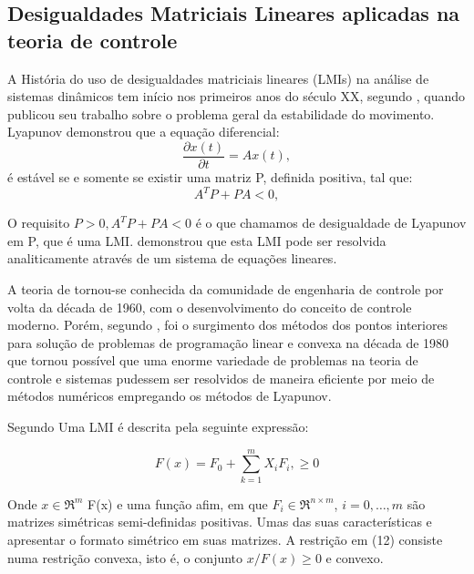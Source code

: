 \subsection{Desigualdades Matriciais Lineares aplicadas na teoria de controle}
A História do uso de desigualdades matriciais lineares (LMIs) na análise de sistemas dinâmicos tem início nos primeiros anos do século XX, segundo \cite{Boyd1994LinearTheory}, quando \cite{Lyapunov1992TheMotion} publicou seu trabalho sobre o problema geral da estabilidade do movimento. Lyapunov demonstrou que a equação diferencial:
\begin{equation} \label{eq:lyapunovdif}
  \frac{\partial x(t)}{\partial t} = Ax(t), 
\end{equation}
é estável se e somente se existir uma matriz P, definida positiva, tal que:
\begin{equation} \label{eq:lyapunovlmi}
  A^{T}P + PA < 0,
\end{equation}
    
O requisito $P>0, A^{T} P + PA < 0$ é o que chamamos de desigualdade de Lyapunov em P, que é uma LMI. \cite{Lyapunov1992TheMotion} demonstrou que esta LMI pode ser resolvida analiticamente através de um sistema de equações lineares.
    
A teoria de \cite{Lyapunov1992TheMotion} tornou-se conhecida da comunidade de engenharia de controle por volta da década de 1960, com o desenvolvimento do conceito de controle moderno. Porém, segundo \cite{Rodrigues2018ParameterizedSystems}, foi o surgimento dos métodos dos pontos interiores para solução de problemas de programação linear e convexa na década de 1980 que tornou possível que uma enorme variedade de problemas na teoria de controle e sistemas pudessem ser resolvidos de maneira eficiente por meio de métodos numéricos empregando os métodos de Lyapunov.

Segundo \cite{Boyd1994LinearTheory} Uma LMI é descrita pela seguinte expressão:

\begin{equation}\label{eq:defLMI}
  F(x) = F_0 + \sum^{m}_{k=1}X_iF_i, \geq 0
\end{equation}

Onde $x \in \Re^{m}$ F(x) e uma função afim, em que $F_i \in \Re^{n \times m}$, $i = 0, \dots, m$ são matrizes simétricas semi-definidas positivas. Umas das suas características e apresentar o formato simétrico em suas matrizes. A restrição em (12) consiste numa restrição convexa, isto é, o conjunto $x/F(x)\geq 0$ e convexo.
    
